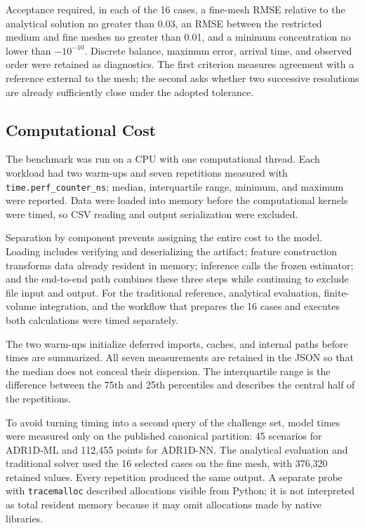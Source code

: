 \documentclass[11pt,a4paper]{article}
\newcommand{\code}[1]{\texttt{#1}}
\begin{document}
Acceptance required, in each of the 16 cases, a fine-mesh RMSE relative to the
analytical solution no greater than 0.03, an RMSE between the restricted medium
and fine meshes no greater than 0.01, and a minimum concentration no lower than
$-10^{-10}$. Discrete balance, maximum error, arrival time, and observed order
were retained as diagnostics. The first criterion measures agreement with a
reference external to the mesh; the second asks whether two successive
resolutions are already sufficiently close under the adopted tolerance.

\subsection{Computational Cost}

The benchmark was run on a CPU with one computational thread. Each workload
had two warm-ups and seven repetitions measured with
\code{time.perf\_counter\_ns}; median, interquartile range, minimum, and maximum
were reported. Data were loaded into memory before the computational kernels
were timed, so CSV reading and output serialization were excluded.

Separation by component prevents assigning the entire cost to the model.
Loading includes verifying and deserializing the artifact; feature construction
transforms data already resident in memory; inference calls the frozen
estimator; and the end-to-end path combines these three steps while continuing
to exclude file input and output. For the traditional reference, analytical
evaluation, finite-volume integration, and the workflow that prepares the 16
cases and executes both calculations were timed separately.

The two warm-ups initialize deferred imports, caches, and internal paths before
times are summarized. All seven measurements are retained in the JSON so that
the median does not conceal their dispersion. The interquartile range is the
difference between the 75th and 25th percentiles and describes the central half
of the repetitions.

To avoid turning timing into a second query of the challenge set, model times
were measured only on the published canonical partition: 45 scenarios for
ADR1D-ML and 112,455 points for ADR1D-NN. The analytical evaluation and
traditional solver used the 16 selected cases on the fine mesh, with 376,320
retained values. Every repetition produced the same output. A separate probe
with \code{tracemalloc} described allocations visible from Python; it is not
interpreted as total resident memory because it may omit allocations made by
native libraries.
\end{document}
